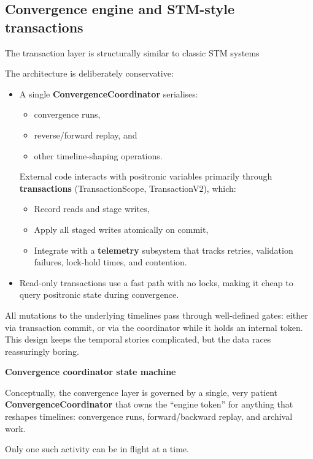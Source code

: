 \documentclass[a4paper,11pt]{article}
\begin{document}
\subsection{Convergence engine and STM-style transactions}

The transaction layer is structurally similar to classic STM systems~\parencite{Tim05}

The architecture is deliberately conservative: 

\begin{itemize}
\item
A single \textbf{ConvergenceCo\-ordinator} serialises:
\begin{itemize}
  \item convergence runs,
  \item reverse/forward replay, and
  \item other timeline-shaping operations.
\end{itemize}
  External code interacts with positronic variables primarily through
  \textbf{transactions} (Transaction\-Scope, Transaction\-V2), which:
  \begin{itemize}
    \item Record reads and stage writes,
    \item Apply all staged writes atomically on commit,
    \item Integrate with a \textbf{telemetry} subsystem that tracks retries,
          validation failures, lock-hold times, and contention.
  \end{itemize}

\item
  Read-only transactions use a fast path with no locks, making it cheap
  to query positronic state during convergence.
\end{itemize}

All mutations to the underlying timelines pass through well-defined gates: either via transaction commit, or via the coordinator while it holds an internal token. This design keeps the temporal stories complicated, but the data races reassuringly boring.

\textbf{Convergence coordinator state machine}

Conceptually, the convergence layer is governed by a single, very patient \textbf{ConvergenceCoordinator} that owns the ``engine token'' for anything that reshapes timelines: convergence runs, forward/backward replay, and archival work.

Only one such activity can be in flight at a time.
\end{document}
